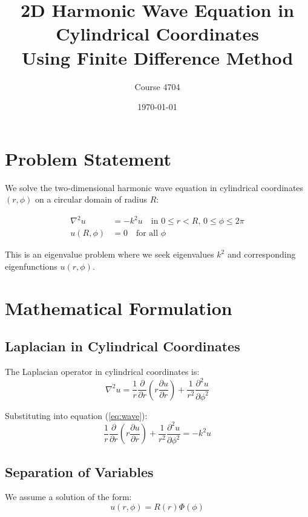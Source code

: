 \documentclass[11pt,a4paper]{article}
\title{2D Harmonic Wave Equation in Cylindrical Coordinates \\
       Using Finite Difference Method}
\author{Course 4704}
\date{\today}
\begin{document}
\maketitle

\section{Problem Statement}

We solve the two-dimensional harmonic wave equation in cylindrical coordinates $(r, \phi)$ on a circular domain of radius $R$:

\begin{align}
\nabla^2 u &= -k^2 u \quad \text{in } 0 \leq r < R, \, 0 \leq \phi \leq 2\pi \label{eq:wave} \\
u(R, \phi) &= 0 \quad \text{for all } \phi \label{eq:bc}
\end{align}

This is an eigenvalue problem where we seek eigenvalues $k^2$ and corresponding eigenfunctions $u(r,\phi)$.

\section{Mathematical Formulation}

\subsection{Laplacian in Cylindrical Coordinates}

The Laplacian operator in cylindrical coordinates is:
\begin{equation}
\nabla^2 u = \frac{1}{r}\frac{\partial}{\partial r}\left(r \frac{\partial u}{\partial r}\right) + \frac{1}{r^2}\frac{\partial^2 u}{\partial \phi^2} \label{eq:laplacian}
\end{equation}

Substituting into equation (\ref{eq:wave}):
\begin{equation}
\frac{1}{r}\frac{\partial}{\partial r}\left(r \frac{\partial u}{\partial r}\right) + \frac{1}{r^2}\frac{\partial^2 u}{\partial \phi^2} = -k^2 u \label{eq:full_pde}
\end{equation}

\subsection{Separation of Variables}

We assume a solution of the form:
\begin{equation}
u(r,\phi) = R(r) \Phi(\phi) \label{eq:separation}
\end{equation}
\end{document}
